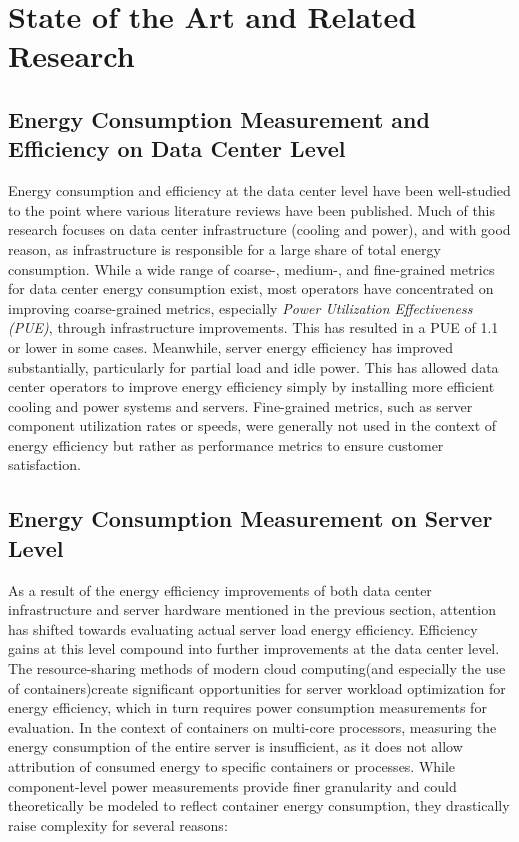 \chapter{State of the Art and Related Research} %
\label{Chapter2}

\section{Energy Consumption Measurement and Efficiency on Data Center Level}

Energy consumption and efficiency at the data center level have been well-studied to the point where various literature reviews have been published\parencite{long2022review, jin2020review}. Much of this research focuses on data center infrastructure (cooling and power), and with good reason, as infrastructure is responsible for a large share of total energy consumption. While a wide range of coarse-, medium-, and fine-grained metrics for data center energy consumption exist, most operators have concentrated on improving coarse-grained metrics, especially \textit{Power Utilization Effectiveness (PUE)}, through infrastructure improvements. This has resulted in a PUE of 1.1 or lower in some cases\parencite{uptime2023pue}. Meanwhile, server energy efficiency has improved substantially, particularly for partial load and idle power\parencite{tropgen202416}. This has allowed data center operators to improve energy efficiency simply by installing more efficient cooling and power systems and servers. Fine-grained metrics, such as server component utilization rates or speeds, were generally not used in the context of energy efficiency but rather as performance metrics to ensure customer satisfaction.

\section{Energy Consumption Measurement on Server Level}

As a result of the energy efficiency improvements of both data center infrastructure and server hardware mentioned in the previous section, attention has shifted towards evaluating actual server load energy efficiency. Efficiency gains at this level compound into further improvements at the data center level. The resource-sharing methods of modern cloud computing(and especially the use of containers)create significant opportunities for server workload optimization for energy efficiency, which in turn requires power consumption measurements for evaluation. In the context of containers on multi-core processors, measuring the energy consumption of the entire server is insufficient, as it does not allow attribution of consumed energy to specific containers or processes. While component-level power measurements provide finer granularity and could theoretically be modeled to reflect container energy consumption, they drastically raise complexity for several reasons:

